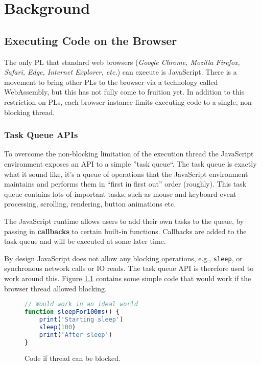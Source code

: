 \chapter{Background}

\section{Executing Code on the Browser}

The only PL that standard web browsers (\emph{Google Chrome, Mozilla Firefox, Safari, Edge, Internet Explorer, etc.}) can execute is JavaScript. There is a movement to bring other PLs to the browser via a technology called WebAssembly, but this has not fully come to fruition yet.  
In addition to this restriction on PLs, each browser instance limits executing code to a single, non-blocking thread.

\subsection{Task Queue APIs}\label{background:task-queues}
To overcome the non-blocking limitation of the execution thread the JavaScript environment exposes an API to a simple ''task queue``.
The task queue is exactly what it sound like, it's a queue of operations that the JavaScript environment maintains and performs them in ``first in first out'' order (roughly). This task queue contains lots of important tasks, such as mouse and keyboard event processing, scrolling, rendering, button animations etc.

The JavaScript runtime allows users to add their own tasks to the queue, by passing in \textbf{callbacks} to certain built-in functions. Callbacks are added to the task queue and will be executed at some later time.

By design JavaScript does not allow any blocking operations, e.g., \verb|sleep|, or synchronous network calls or IO reads. The task queue API is therefore used to work around this.
Figure \ref{blockingcode} contains some simple code that would work if the browser thread allowed blocking.

\begin{figure}
    \caption{Code if thread can be blocked.}
    \label{blockingcode}
    \begin{lstlisting}[language=javascript]
// Would work in an ideal world
function sleepFor100ms() {
    print('Starting sleep')
    sleep(100)
    print('After sleep')
}
    \end{lstlisting}
\end{figure}

